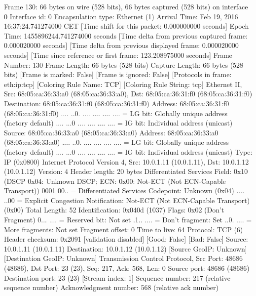 Frame 130: 66 bytes on wire (528 bits), 66 bytes captured (528 bits) on interface 0
    Interface id: 0
    Encapsulation type: Ethernet (1)
    Arrival Time: Feb 19, 2016 16:37:24.741274000 CET
    [Time shift for this packet: 0.000000000 seconds]
    Epoch Time: 1455896244.741274000 seconds
    [Time delta from previous captured frame: 0.000020000 seconds]
    [Time delta from previous displayed frame: 0.000020000 seconds]
    [Time since reference or first frame: 123.208975000 seconds]
    Frame Number: 130
    Frame Length: 66 bytes (528 bits)
    Capture Length: 66 bytes (528 bits)
    [Frame is marked: False]
    [Frame is ignored: False]
    [Protocols in frame: eth:ip:tcp]
    [Coloring Rule Name: TCP]
    [Coloring Rule String: tcp]
Ethernet II, Src: 68:05:ca:36:33:a0 (68:05:ca:36:33:a0), Dst: 68:05:ca:36:31:f0 (68:05:ca:36:31:f0)
    Destination: 68:05:ca:36:31:f0 (68:05:ca:36:31:f0)
        Address: 68:05:ca:36:31:f0 (68:05:ca:36:31:f0)
        .... ..0. .... .... .... .... = LG bit: Globally unique address (factory default)
        .... ...0 .... .... .... .... = IG bit: Individual address (unicast)
    Source: 68:05:ca:36:33:a0 (68:05:ca:36:33:a0)
        Address: 68:05:ca:36:33:a0 (68:05:ca:36:33:a0)
        .... ..0. .... .... .... .... = LG bit: Globally unique address (factory default)
        .... ...0 .... .... .... .... = IG bit: Individual address (unicast)
    Type: IP (0x0800)
Internet Protocol Version 4, Src: 10.0.1.11 (10.0.1.11), Dst: 10.0.1.12 (10.0.1.12)
    Version: 4
    Header length: 20 bytes
    Differentiated Services Field: 0x10 (DSCP 0x04: Unknown DSCP; ECN: 0x00: Not-ECT (Not ECN-Capable Transport))
        0001 00.. = Differentiated Services Codepoint: Unknown (0x04)
        .... ..00 = Explicit Congestion Notification: Not-ECT (Not ECN-Capable Transport) (0x00)
    Total Length: 52
    Identification: 0x040d (1037)
    Flags: 0x02 (Don't Fragment)
        0... .... = Reserved bit: Not set
        .1.. .... = Don't fragment: Set
        ..0. .... = More fragments: Not set
    Fragment offset: 0
    Time to live: 64
    Protocol: TCP (6)
    Header checksum: 0x2091 [validation disabled]
        [Good: False]
        [Bad: False]
    Source: 10.0.1.11 (10.0.1.11)
    Destination: 10.0.1.12 (10.0.1.12)
    [Source GeoIP: Unknown]
    [Destination GeoIP: Unknown]
Transmission Control Protocol, Src Port: 48686 (48686), Dst Port: 23 (23), Seq: 217, Ack: 568, Len: 0
    Source port: 48686 (48686)
    Destination port: 23 (23)
    [Stream index: 1]
    Sequence number: 217    (relative sequence number)
    Acknowledgment number: 568    (relative ack number)

